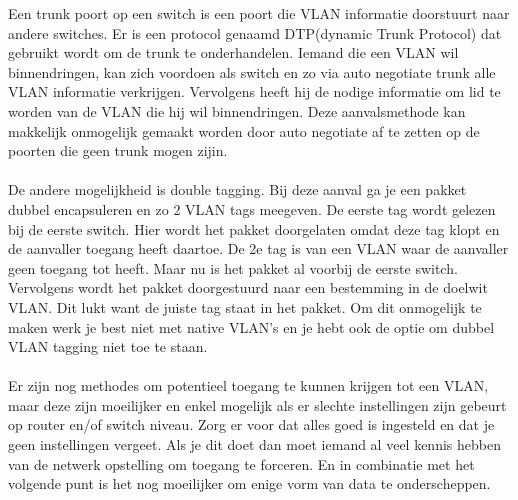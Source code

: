 \documentclass[pdftex,a4paper,12pt,twoside]{report}
\begin{document}
Een trunk poort op een switch is een poort die VLAN informatie doorstuurt naar andere switches. Er is een protocol genaamd DTP(dynamic Trunk Protocol) dat gebruikt wordt om de trunk te onderhandelen. Iemand die een VLAN wil binnendringen, kan zich voordoen als switch en zo via auto negotiate trunk alle VLAN informatie verkrijgen. Vervolgens heeft hij de nodige informatie om lid te worden van de VLAN die hij wil binnendringen. Deze aanvalsmethode kan makkelijk onmogelijk gemaakt worden door auto negotiate af te zetten op de poorten die geen trunk mogen zijin. \\ \\
De andere mogelijkheid is double tagging. Bij deze aanval ga je een pakket dubbel encapsuleren en zo 2 VLAN tags meegeven. De eerste tag wordt gelezen bij de eerste switch. Hier wordt het pakket doorgelaten omdat deze tag klopt en de aanvaller toegang heeft daartoe. De 2e tag is van een VLAN waar de aanvaller geen toegang tot heeft. Maar nu is het pakket al voorbij de eerste switch. Vervolgens wordt het pakket doorgestuurd naar een bestemming in de doelwit VLAN. Dit lukt want de juiste tag staat in het pakket. Om dit onmogelijk te maken werk je best niet met native VLAN's en je hebt ook de optie om dubbel VLAN tagging niet toe te staan.
\\ \\
Er zijn nog methodes om potentieel toegang te kunnen krijgen tot een VLAN, maar deze zijn moeilijker en enkel mogelijk als er slechte instellingen zijn gebeurt op router en/of switch niveau. Zorg er voor dat alles goed is ingesteld en dat je geen instellingen vergeet. Als je dit doet dan moet iemand al veel kennis hebben van de netwerk opstelling om toegang te forceren.
En in combinatie met het volgende punt is het nog moeilijker om enige vorm van data te onderscheppen.
\end{document}
